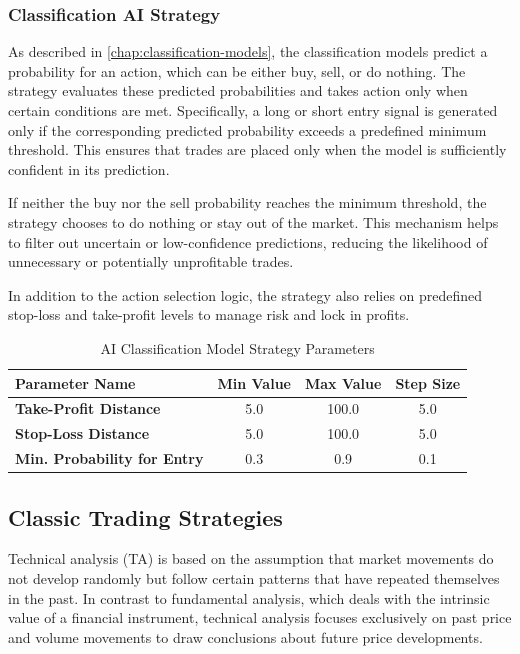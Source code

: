 \subsubsection{Classification AI Strategy}

As described in \autoref{chap:classification-models}, the classification models predict a probability for an action, which can be either buy, sell, or do nothing.
The strategy evaluates these predicted probabilities and takes action only when certain conditions are met.
Specifically, a long or short entry signal is generated only if the corresponding predicted probability exceeds a predefined minimum threshold.
This ensures that trades are placed only when the model is sufficiently confident in its prediction.

If neither the buy nor the sell probability reaches the minimum threshold, the strategy chooses to do nothing or stay out of the market.
This mechanism helps to filter out uncertain or low-confidence predictions, reducing the likelihood of unnecessary or potentially unprofitable trades.

In addition to the action selection logic, the strategy also relies on predefined stop-loss and take-profit levels to manage risk and lock in profits.


\begin{table}[H]
    \centering
    \begin{tabular}{L{4cm}ccc}
        \toprule
        \textbf{Parameter Name} & Min Value & Max Value & Step Size
        \\
        \midrule
        \textbf{Take-Profit Distance}       & 5.0 & 100.0 & 5.0 \\
        \textbf{Stop-Loss Distance}         & 5.0 & 100.0 & 5.0 \\
        \textbf{Min. Probability for Entry} & 0.3 & 0.9   & 0.1 \\
        \bottomrule
    \end{tabular}
    \caption{AI Classification Model Strategy Parameters}
    \label{tbl:classification-strategy-parameters}
\end{table}

\subsection{Classic Trading Strategies}

Technical analysis (TA) is based on the assumption that market movements do not develop randomly but follow certain patterns that have repeated themselves in the past.
In contrast to fundamental analysis, which deals with the intrinsic value of a financial instrument, technical analysis focuses exclusively on past price and volume movements to draw conclusions about future price developments.

